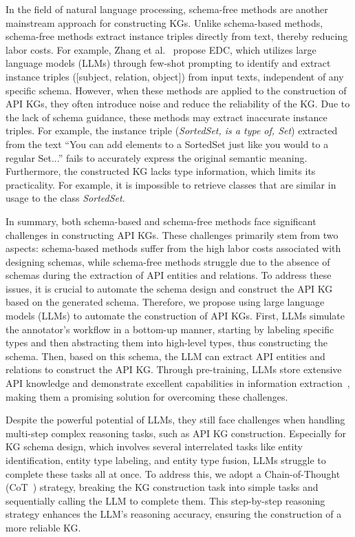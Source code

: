 In the field of natural language processing, schema-free methods \cite{GraphRAG, EDC, free3, free4} are another mainstream approach for constructing KGs.
Unlike schema-based methods, schema-free methods extract instance triples directly from text, thereby reducing labor costs.
For example, Zhang et al.~\cite{EDC} propose EDC, which utilizes large language models (LLMs) through few-shot prompting to identify and extract instance triples ([subject, relation, object]) from input texts, independent of any specific schema.
However, when these methods are applied to the construction of API KGs, they often introduce noise and reduce the reliability of the KG.
Due to the lack of schema guidance, these methods may extract inaccurate instance triples.
For example, the instance triple (\textit{SortedSet, is a type of, Set}) extracted from the text ``You can add elements to a SortedSet just like you would to a regular Set...'' fails to accurately express the original semantic meaning.
Furthermore, the constructed KG lacks type information, which limits its practicality.
For example, it is impossible to retrieve classes that are similar in usage to the class \textit{SortedSet}.

In summary, both schema-based and schema-free methods face significant challenges in constructing API KGs.
These challenges primarily stem from two aspects: schema-based methods suffer from the high labor costs associated with designing schemas, while schema-free methods struggle due to the absence of schemas during the extraction of API entities and relations.
To address these issues, it is crucial to automate the schema design and construct the API KG based on the generated schema.
Therefore, we propose using large language models (LLMs) to automate the construction of API KGs.
First, LLMs simulate the annotator's workflow in a bottom-up manner, starting by labeling specific types and then abstracting them into high-level types, thus constructing the schema.
Then, based on this schema, the LLM can extract API entities and relations to construct the API KG.
Through pre-training, LLMs store extensive API knowledge and demonstrate excellent capabilities in information extraction~\cite{yanbang1, yanbang2}, making them a promising solution for overcoming these challenges.

Despite the powerful potential of LLMs, they still face challenges when handling multi-step complex reasoning tasks, such as API KG construction.
Especially for KG schema design, which involves several interrelated tasks like entity identification, entity type labeling, and entity type fusion, LLMs struggle to complete these tasks all at once.
To address this, we adopt a Chain-of-Thought (CoT~\cite{cot1, cot2, cot3, yanbang2}) strategy, breaking the KG construction task into simple tasks and sequentially calling the LLM to complete them.
This step-by-step reasoning strategy enhances the LLM's reasoning accuracy, ensuring the construction of a more reliable KG.

